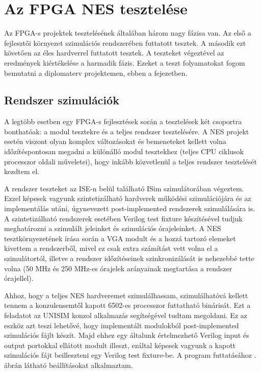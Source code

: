 \chapter{Az FPGA NES tesztelése}

Az FPGA-s projektek tesztelésének általában három nagy fázisa van. Az első a fejlesztői környezet szimulációs rendszerében futtatott tesztek. A második ezt követően az éles hardverrel futtatott tesztek. A teszteket végeztével az eredmények kiértékelése a harmadik fázis. Ezeket a teszt folyamatokat fogom bemutatni a diplomaterv projektemen, ebben a fejezetben.

\section{Rendszer szimulációk}

A legtöbb esetben egy FPGA-s fejlesztések során a tesztelések két csoportra bonthatóak: a modul tesztekre és a teljes rendszer tesztelésére. A NES projekt esetén viszont olyan komplex változásokat és bemeneteket kellett volna időzítéspontosan megadni a különálló modul tesztekhez (teljes CPU ciklusok processzor oldali műveletei), hogy inkább közvetlenül a teljes rendszer tesztelését kezdtem el.

A rendszer teszteket az ISE-n belül található ISim szimulátorában végeztem. Ezzel képesek vagyunk szintetizálható hardverek működési szimulációjára és az implementálás utáni, úgynevezett post-implemented rendszerek szimulálására is. A szintetizálható rendszerek esetében Verilog test fixture készítésével tudjuk meghatározni a szimulált jeleinket és szimulációs órajeleinket. A NES tesztkörnyezetének írása során a VGA modult és a hozzá tartozó elemeket kivettem a rendszerből, mivel ez csak extra számítást vett volna el a szimulátortól, illetve a rendszer időzítéseinek szinkronizálását is nehezebbé tette volna (50 MHz és 250 MHz-es órajelek arányainak megtartása a rendszer órajellel).

Ahhoz, hogy a teljes NES hardveremet szimulálhassam, szimulálhatóvá kellett tennem a konzulensemtől kapott 6502-es processzor futtatható binárisát. Ezt a feladatot az UNISIM konzol alkalmazás segítségével tudtam megoldani. Ez az eszköz azt teszi lehetővé, hogy implementált modulokból post-implemented szimulációs fájlt készít. Majd ehhez egy általunk értelmezhető Verilog input és output portokkal ellátott modult illeszt, ezáltal képesek vagyunk a kapott szimulációs fájt beilleszteni egy Verilog test fixture-be. A program futtatásához . ábrán látható beállításokat alkalmaztam.


